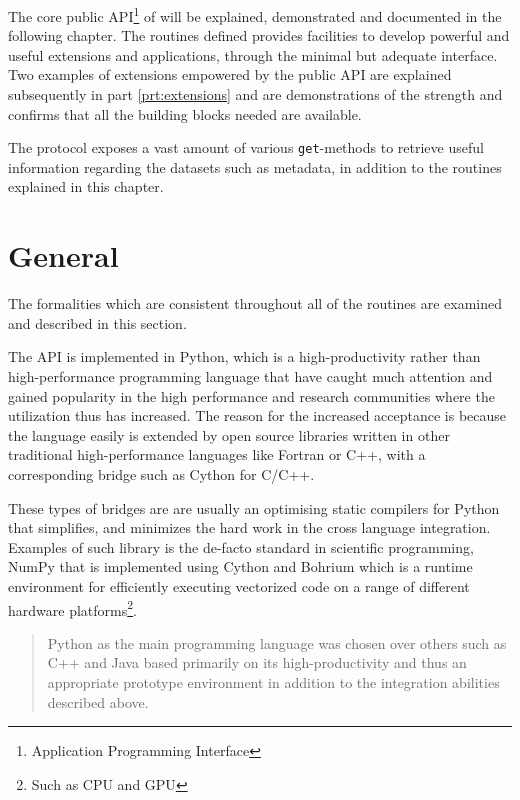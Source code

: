 The core public API\footnote{Application Programming Interface} of \CodeName will be explained, demonstrated and documented in the following chapter. The routines defined provides facilities to develop powerful and useful extensions and applications, through the minimal but adequate interface. Two examples of extensions empowered by the public \CodeName API are explained subsequently in part \ref{prt:extensions} and are demonstrations of the strength and confirms that all the building blocks needed are available.
\newline

The protocol exposes a vast amount of various \texttt{get}-methods to retrieve useful information regarding the datasets such as metadata, in addition to the routines explained in this chapter.

\section{General}
The formalities which are consistent throughout all of the routines are examined and described in this section.

The API is implemented in Python\cite{PagePython}, which is a high-productivity rather than high-performance programming language that have caught much attention and gained popularity in the high performance and research communities where the utilization thus has increased. The reason for the increased acceptance is because the language easily is extended by open source libraries written in other traditional high-performance languages like Fortran or C++, with a corresponding bridge such as Cython\cite{PageCPython} for C/C++. 
\newline

These types of bridges are are usually an optimising static compilers for Python that simplifies, and minimizes the hard work in the cross language integration. Examples of such library is the de-facto standard in scientific programming, NumPy \cite{PageNumpy} \cite{oliphant2006guide} that is implemented using Cython and Bohrium \cite{PageBohrium} \cite{kristensen2013bohrium} which is a runtime environment for efficiently executing vectorized code on a range of different hardware platforms\footnote{Such as CPU and GPU}.

\begin{quotation}
Python as the main programming language was chosen over others such as C++ and Java based primarily on its high-productivity and thus an appropriate prototype environment in addition to the integration abilities described above.
\end{quotation}

